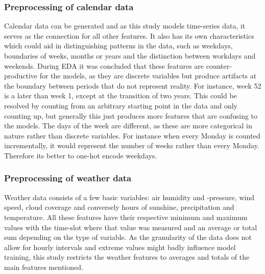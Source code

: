 \subsubsection{Preprocessing of calendar data}
Calendar data can be generated and as this study models time-series data, it serves as the connection for all other features. It also has its own characteristics which could aid in distinguishing patterns in the data, such as weekdays, boundaries of weeks, months or years and the distinction between workdays and weekends. During EDA it was concluded that these features are counter-productive for the models, as they are discrete variables but produce artifacts at the boundary between periods that do not represent reality. For instance, week 52 is a later than week 1, except at the transition of two years. This could be resolved by counting from an arbitrary starting point in the data and only counting up, but generally this just produces more features that are confusing to the models. The days of the week are different, as these are more categorical in nature rather than discrete variables. For instance when every Monday is counted incrementally, it would represent the number of weeks rather than every Monday. Therefore its better to one-hot encode weekdays.

\subsubsection{Preprocessing of weather data}
Weather data consists of a few basic variables: air humidity and -pressure, wind speed, cloud coverage and conversely hours of sunshine, precipitation and temperature. All these features have their respective minimum and maximum values with the time-slot where that value was measured and an average or total sum depending on the type of variable. As the granularity of the data does not allow for hourly intervals and extreme values might badly influence model training, this study restricts the weather features to averages and totals of the main features mentioned.

